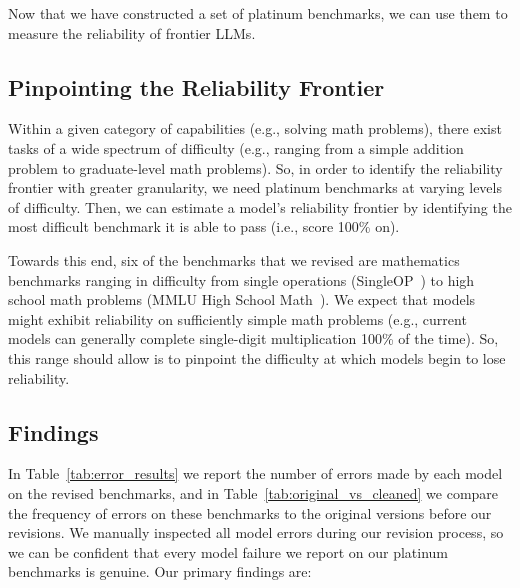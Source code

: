 


Now that we have constructed a set of platinum benchmarks, we can use them to measure the reliability of frontier LLMs.

\subsection{Pinpointing the Reliability Frontier}
Within a given category of capabilities (e.g., solving math problems), there exist tasks of a wide spectrum of difficulty (e.g., ranging from a simple addition problem to graduate-level math problems).
So, in order to identify the reliability frontier with greater granularity, we need platinum benchmarks at varying levels of difficulty. Then, we can estimate a model's reliability frontier by identifying the most difficult benchmark it is able to pass (i.e., score 100\% on).


Towards this end, six of the benchmarks that we revised are mathematics benchmarks ranging in difficulty from single operations (SingleOP~\cite{roy2015reasoning}) to high school math problems (MMLU High School Math~\citep{hendrycks2020measuring}). We expect that models might exhibit reliability on sufficiently simple math problems (e.g., current models can generally complete single-digit multiplication 100\% of the time). So, this range should allow is to pinpoint the difficulty at which models begin to lose reliability.






\subsection{Findings}
In Table~\ref{tab:error_results} we report the number of errors made by each model on the revised benchmarks, and in Table~\ref{tab:original_vs_cleaned} we compare the frequency of errors on these benchmarks to the original versions before our revisions. 
We manually inspected all model errors during our revision process, so we can be confident that every model failure we report on our platinum benchmarks is genuine.
Our primary findings are:

